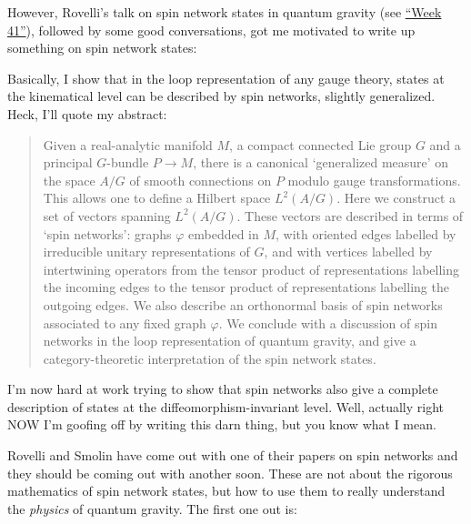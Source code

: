 \documentclass{article}
\def\tightlist{}
\renewcommand{\texttt}[1]{%
  \begingroup
  \ttfamily
  \begingroup\lccode`~=`/\lowercase{\endgroup\def~}{/\discretionary{}{}{}}%
  \begingroup\lccode`~=`[\lowercase{\endgroup\def~}{[\discretionary{}{}{}}%
  \begingroup\lccode`~=`.\lowercase{\endgroup\def~}{.\discretionary{}{}{}}%
  \catcode`/=\active\catcode`[=\active\catcode`.=\active
  \scantokens{#1\noexpand}%
  \endgroup
}
\begin{document}
However, Rovelli's talk on spin network states in quantum gravity (see
\protect\hyperlink{week41}{``Week 41''}), followed by some good
conversations, got me motivated to write up something on spin network
states:

\noindent
Basically, I show that in the loop representation of any gauge theory,
states at the kinematical level can be described by spin networks,
slightly generalized. Heck, I'll quote my abstract:

\begin{quote}
Given a real-analytic manifold \(M\), a compact connected Lie group
\(G\) and a principal \(G\)-bundle \(P \to M\), there is a canonical
`generalized measure' on the space \(A/G\) of smooth connections on
\(P\) modulo gauge transformations. This allows one to define a Hilbert
space \(L^2(A/G)\). Here we construct a set of vectors spanning
\(L^2(A/G)\). These vectors are described in terms of `spin networks':
graphs \(\varphi\) embedded in \(M\), with oriented edges labelled by
irreducible unitary representations of \(G\), and with vertices labelled
by intertwining operators from the tensor product of representations
labelling the incoming edges to the tensor product of representations
labelling the outgoing edges. We also describe an orthonormal basis of
spin networks associated to any fixed graph \(\varphi\). We conclude
with a discussion of spin networks in the loop representation of quantum
gravity, and give a category-theoretic interpretation of the spin
network states.
\end{quote}

I'm now hard at work trying to show that spin networks also give a
complete description of states at the diffeomorphism-invariant level.
Well, actually right NOW I'm goofing off by writing this darn thing, but
you know what I mean.

Rovelli and Smolin have come out with one of their papers on spin
networks and they should be coming out with another soon. These are not
about the rigorous mathematics of spin network states, but how to use
them to really understand the \emph{physics} of quantum gravity. The
first one out is:
\end{document}

